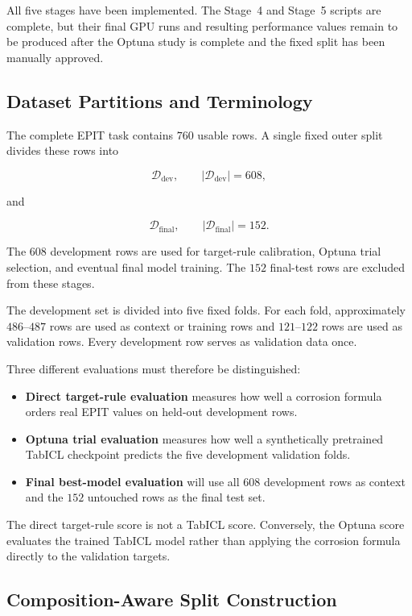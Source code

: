 \documentclass{article}
\begin{document}
All five stages have been implemented. The Stage~4 and Stage~5 scripts are
complete, but their final GPU runs and resulting performance values remain to
be produced after the Optuna study is complete and the fixed split has been
manually approved.

\subsection{Dataset Partitions and Terminology}
\label{sec:epit-pipeline-partitions}

The complete EPIT task contains \(760\) usable rows. A single fixed outer split
divides these rows into

\[
\mathcal{D}_{\mathrm{dev}},
\qquad
|\mathcal{D}_{\mathrm{dev}}|=608,
\]

and

\[
\mathcal{D}_{\mathrm{final}},
\qquad
|\mathcal{D}_{\mathrm{final}}|=152.
\]

The \(608\) development rows are used for target-rule calibration, Optuna trial
selection, and eventual final model training. The \(152\) final-test rows are
excluded from these stages.

The development set is divided into five fixed folds. For each fold,
approximately \(486\)--\(487\) rows are used as context or training rows and
\(121\)--\(122\) rows are used as validation rows. Every development row serves
as validation data once.

Three different evaluations must therefore be distinguished:

\begin{itemize}
    \item \textbf{Direct target-rule evaluation} measures how well a corrosion
    formula orders real EPIT values on held-out development rows.
    \item \textbf{Optuna trial evaluation} measures how well a synthetically
    pretrained TabICL checkpoint predicts the five development validation
    folds.
    \item \textbf{Final best-model evaluation} will use all \(608\) development
    rows as context and the \(152\) untouched rows as the final test set.
\end{itemize}

The direct target-rule score is not a TabICL score. Conversely, the Optuna
score evaluates the trained TabICL model rather than applying the corrosion
formula directly to the validation targets.

\subsection{Composition-Aware Split Construction}
\label{sec:epit-composition-split}
\end{document}
